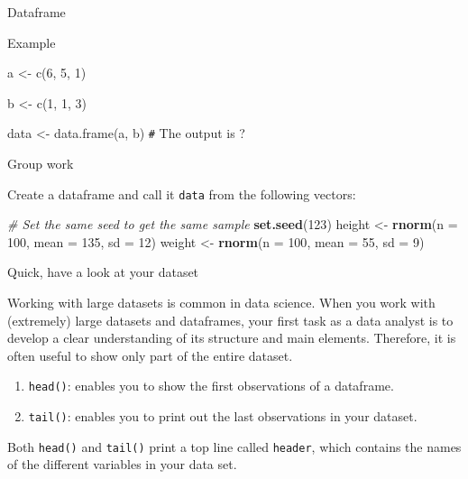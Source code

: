 \documentclass[
  ignorenonframetext,
]{beamer}
\newenvironment{Shaded}{\begin{snugshade}}{\end{snugshade}}
\newcommand{\CommentTok}[1]{\textcolor[rgb]{0.56,0.35,0.01}{\textit{#1}}}
\newcommand{\DataTypeTok}[1]{\textcolor[rgb]{0.13,0.29,0.53}{#1}}
\newcommand{\DecValTok}[1]{\textcolor[rgb]{0.00,0.00,0.81}{#1}}
\newcommand{\KeywordTok}[1]{\textcolor[rgb]{0.13,0.29,0.53}{\textbf{#1}}}
\newcommand{\NormalTok}[1]{#1}
\newcommand{\StringTok}[1]{\textcolor[rgb]{0.31,0.60,0.02}{#1}}
\begin{document}
\begin{frame}[fragile]{Dataframe}
\protect\hypertarget{dataframe-1}{}

\begin{block}{Example}

a \textless- c(6, 5, 1)

b \textless- c(1, 1, 3)

data \textless- data.frame(a, b) \texttt{\#} The output is ?

\end{block}

\begin{block}{Group work}

Create a dataframe and call it \texttt{data} from the following vectors:

\begin{Shaded}
\begin{Highlighting}[]
\CommentTok{# Set the same seed to get the same sample}
\KeywordTok{set.seed}\NormalTok{(}\DecValTok{123}\NormalTok{)}
\NormalTok{height <-}\StringTok{ }\KeywordTok{rnorm}\NormalTok{(}\DataTypeTok{n =} \DecValTok{100}\NormalTok{, }\DataTypeTok{mean =} \DecValTok{135}\NormalTok{, }\DataTypeTok{sd =} \DecValTok{12}\NormalTok{)}
\NormalTok{weight <-}\StringTok{ }\KeywordTok{rnorm}\NormalTok{(}\DataTypeTok{n =} \DecValTok{100}\NormalTok{, }\DataTypeTok{mean =} \DecValTok{55}\NormalTok{, }\DataTypeTok{sd =} \DecValTok{9}\NormalTok{)}
\end{Highlighting}
\end{Shaded}

\end{block}

\end{frame}

\begin{frame}[fragile]{Quick, have a look at your dataset}
\protect\hypertarget{quick-have-a-look-at-your-dataset}{}

Working with large datasets is common in data science. When you work
with (extremely) large datasets and dataframes, your first task as a
data analyst is to develop a clear understanding of its structure and
main elements. Therefore, it is often useful to show only part of the
entire dataset.

\begin{enumerate}
\item
  \texttt{head()}: enables you to show the first observations of a
  dataframe.
\item
  \texttt{tail()}: enables you to print out the last observations in
  your dataset.
\end{enumerate}

Both \texttt{head()} and \texttt{tail()} print a top line called
\texttt{header}, which contains the names of the different variables in
your data set.

\end{frame}
\end{document}
